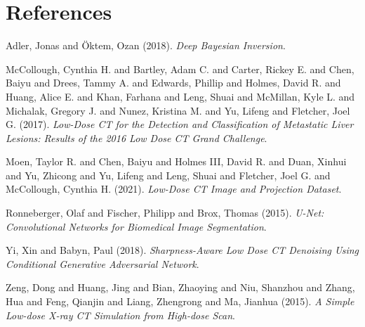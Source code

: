 \documentclass[a4paper, 11pt]{article}
\begin{document}
\section{References}
\label{sec:org8d48630}
\noindent
Adler, Jonas and Öktem, Ozan (2018). \emph{Deep {{Bayesian Inversion}}}.

\noindent
McCollough, Cynthia H. and Bartley, Adam C. and Carter, Rickey E. and Chen, Baiyu and Drees, Tammy A. and Edwards, Phillip and Holmes, David R. and Huang, Alice E. and Khan, Farhana and Leng, Shuai and McMillan, Kyle L. and Michalak, Gregory J. and Nunez, Kristina M. and Yu, Lifeng and Fletcher, Joel G. (2017). \emph{Low-Dose {{CT}} for the Detection and Classification of Metastatic Liver Lesions: {{Results}} of the 2016 {{Low Dose CT Grand Challenge}}}.

\noindent
Moen, Taylor R. and Chen, Baiyu and Holmes III, David R. and Duan, Xinhui and Yu, Zhicong and Yu, Lifeng and Leng, Shuai and Fletcher, Joel G. and McCollough, Cynthia H. (2021). \emph{Low-Dose {{CT}} Image and Projection Dataset}.

\noindent
Ronneberger, Olaf and Fischer, Philipp and Brox, Thomas (2015). \emph{U-{{Net}}: {{Convolutional Networks}} for {{Biomedical Image Segmentation}}}.

\noindent
Yi, Xin and Babyn, Paul (2018). \emph{Sharpness-Aware {{Low}} Dose {{CT}} Denoising Using Conditional Generative Adversarial Network}.

\noindent
Zeng, Dong and Huang, Jing and Bian, Zhaoying and Niu, Shanzhou and Zhang, Hua and Feng, Qianjin and Liang, Zhengrong and Ma, Jianhua (2015). \emph{A {{Simple Low-dose X-ray CT Simulation}} from {{High-dose Scan}}}.
\end{document}
